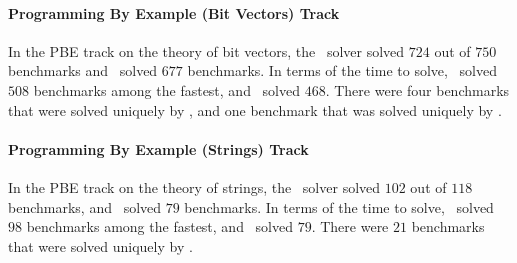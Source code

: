 \paragraph{Programming By Example (Bit Vectors) Track}
In the PBE track on the theory of bit vectors, the \cvcnew\ solver solved $724$ out of $750$ benchmarks
and \eusolvernew\ solved $677$ benchmarks.
In terms of the time to solve, \cvcnew\ solved $508$ benchmarks among the fastest,
and \eusolvernew\ solved $468$.
There were four benchmarks that were solved uniquely by \cvcnew,
and one benchmark that was solved uniquely by \eusolvernew.

\paragraph{Programming By Example (Strings) Track}
In the PBE track on the theory of strings, the \cvcnew\ solver solved $102$ out of $118$ benchmarks,
and \eusolvernew\ solved $79$ benchmarks.
In terms of the time to solve, \cvcnew\ solved $98$ benchmarks among the fastest,
and \eusolvernew\ solved $79$.
There were $21$ benchmarks that were solved uniquely by \cvcnew.